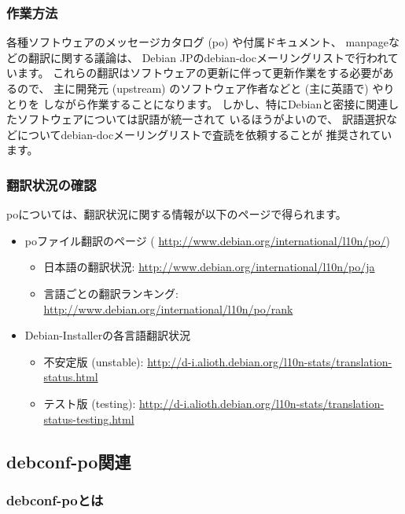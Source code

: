 \documentclass[mingoth,a4paper]{jsarticle}
\begin{document}
\subsubsection{作業方法}

各種ソフトウェアのメッセージカタログ (po) や付属ドキュメント、
manpageなどの翻訳に関する議論は、
Debian JPのdebian-docメーリングリストで行われています。
これらの翻訳はソフトウェアの更新に伴って更新作業をする必要があるので、
主に開発元 (upstream) のソフトウェア作者などと (主に英語で) やりとりを
しながら作業することになります。
しかし、特にDebianと密接に関連したソフトウェアについては訳語が統一されて
いるほうがよいので、
訳語選択などについてdebian-docメーリングリストで査読を依頼することが
推奨されています。

\subsubsection{翻訳状況の確認}

poについては、翻訳状況に関する情報が以下のページで得られます。
\begin{itemize}
 \item poファイル翻訳のページ (%
       \url{http://www.debian.org/international/l10n/po/})
       \begin{itemize}
	\item 日本語の翻訳状況:
	      \url{http://www.debian.org/international/l10n/po/ja}
	\item 言語ごとの翻訳ランキング:
	      \url{http://www.debian.org/international/l10n/po/rank}
       \end{itemize}
 \item Debian-Installerの各言語翻訳状況
       \begin{itemize}
	\item 不安定版 (unstable):
	      \url{http://d-i.alioth.debian.org/l10n-stats/translation-status.html}
	\item テスト版 (testing):
	      \url{http://d-i.alioth.debian.org/l10n-stats/translation-status-testing.html}
       \end{itemize}
\end{itemize}

\subsection{debconf-po関連}

\subsubsection{debconf-poとは}
\end{document}
